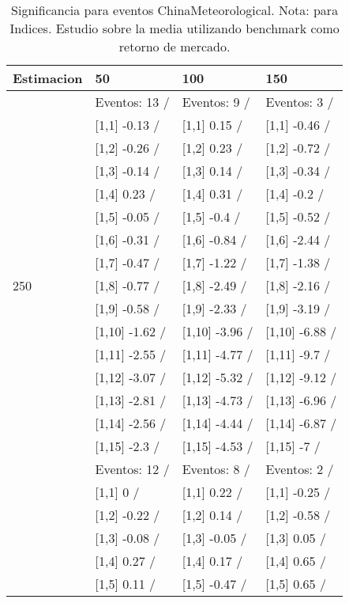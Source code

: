 \begin{table}

\caption{Significancia para eventos ChinaMeteorological. Nota: para Indices. Estudio sobre la media utilizando benchmark como retorno de mercado.}
\centering
\begin{tabular}[t]{llll}
\toprule
Estimacion & 50 & 100 & 150\\
\midrule
 & Eventos:  13 / & Eventos:  9 / & Eventos:  3 /\\
 & {}[1,1] -0.13  / & {}[1,1] 0.15  / & {}[1,1] -0.46  /\\
 & {}[1,2] -0.26  / & {}[1,2] 0.23  / & {}[1,2] -0.72  /\\
 & {}[1,3] -0.14  / & {}[1,3] 0.14  / & {}[1,3] -0.34  /\\
 & {}[1,4] 0.23  / & {}[1,4] 0.31  / & {}[1,4] -0.2  /\\
\addlinespace
 & {}[1,5] -0.05  / & {}[1,5] -0.4  / & {}[1,5] -0.52  /\\
 & {}[1,6] -0.31  / & {}[1,6] -0.84  / & {}[1,6] -2.44  /\\
 & {}[1,7] -0.47  / & {}[1,7] -1.22  / & {}[1,7] -1.38  /\\
250 & {}[1,8] -0.77  / & {}[1,8] -2.49  / & {}[1,8] -2.16  /\\
 & {}[1,9] -0.58  / & {}[1,9] -2.33  / & {}[1,9] -3.19  /\\
\addlinespace
 & {}[1,10] -1.62  / & {}[1,10] -3.96  / & {}[1,10] -6.88  /\\
 & {}[1,11] -2.55  / & {}[1,11] -4.77  / & {}[1,11] -9.7  /\\
 & {}[1,12] -3.07  / & {}[1,12] -5.32  / & {}[1,12] -9.12  /\\
 & {}[1,13] -2.81  / & {}[1,13] -4.73  / & {}[1,13] -6.96  /\\
 & {}[1,14] -2.56  / & {}[1,14] -4.44  / & {}[1,14] -6.87  /\\
\addlinespace
 & {}[1,15] -2.3  / & {}[1,15] -4.53  / & {}[1,15] -7  /\\
 & Eventos:  12 / & Eventos:  8 / & Eventos:  2 /\\
 & {}[1,1] 0  / & {}[1,1] 0.22  / & {}[1,1] -0.25  /\\
 & {}[1,2] -0.22  / & {}[1,2] 0.14  / & {}[1,2] -0.58  /\\
 & {}[1,3] -0.08  / & {}[1,3] -0.05  / & {}[1,3] 0.05  /\\
\addlinespace
 & {}[1,4] 0.27  / & {}[1,4] 0.17  / & {}[1,4] 0.65  /\\
 & {}[1,5] 0.11  / & {}[1,5] -0.47  / & {}[1,5] 0.65  /\\

\end{tabular}
\end{table}
